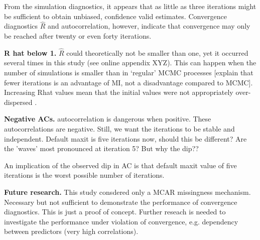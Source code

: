 \documentclass[article]{jss}
\begin{document}
From the simulation diagnostics, it appears that as little as three iterations might be sufficient to obtain unbiased, confidence valid estimates. Convergence diagnostics $\widehat{R}$ and autocorrelation, however, indicate that convergence may only be reached after twenty or even forty iterations. 

\textbf{R hat below 1.}
$\widehat{R}$ could theoretically not be smaller than one, yet it occurred several times in this study (see online appendix XYZ). This can happen when the number of simulations is smaller than in `regular' MCMC processes [explain that fewer iterations is an advantage of MI, not a disadvantage compared to MCMC]. Increasing Rhat values mean that the initial values were not appropriately over-dispersed \citep[p~438]{broo98}. %


\textbf{Negative ACs.} autocorrelation is dangerous when positive. These autocorrelations are negative. Still, we want the iterations to be stable and independent. Default maxit is five iterations now, should this be different? Are the 'waves' most pronounced at iteration 5? But why the dip??  

An implication of the observed dip in AC is that default maxit value of five iterations is the worst possible number of iterations.

\textbf{Future research.} This study consdered only a MCAR missingness mechanism. Necessary but not sufficient to demonstrate the performance of convergence diagnostics. This is just a proof of concept. Further reseach is needed to investigate the performance under violation of convergence, e.g. dependency between predictors (very high correlations). %
\end{document}
